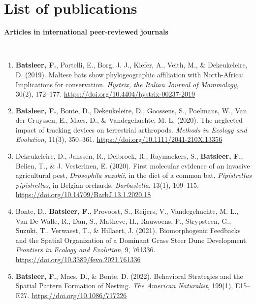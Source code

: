 \documentclass[10pt, twoside]{book} %
\renewcommand{\chaptermark}[1]{\markboth{#1}{}}
\begin{document}
\clearpage
\thispagestyle{plain}
\hbox{}
\clearpage
\newpage
\pagestyle{mainmatter}
\chapter*{List of publications}
\chaptermark{List of publications}

\begin{large}\textbf{Articles in international peer-reviewed journals}\end{large}\\

	\begin{enumerate}
		\item \textbf{Batsleer, F.}, Portelli, E., Borg, J. J., Kiefer, A., Veith, M., \& Dekeukeleire, D. (2019). Maltese bats show phylogeographic affiliation with North-Africa: Implications for conservation. \textit{Hystrix, the Italian Journal of Mammalogy}, 30(2), 172–177. \url{https://doi.org/10.4404/hystrix-00237-2019}
		
		\item \textbf{Batsleer, F.}, Bonte, D., Dekeukeleire, D., Goossens, S., Poelmans, W., Van der Cruyssen, E., Maes, D., \& Vandegehuchte, M. L. (2020). The neglected impact of tracking devices on terrestrial arthropods. \textit{Methods in Ecology and Evolution}, 11(3), 350–361. \url{https://doi.org/10.1111/2041-210X.13356}
		
		\item Dekeukeleire, D., Janssen, R., Delbroek, R., Raymaekers, S., \textbf{Batsleer, F.}, Belien, T., \& J. Vesterinen, E. (2020). First molecular evidence of an invasive agricultural pest, \textit{Drosophila suzukii}, in the diet of a common bat, \textit{Pipistrellus pipistrellus}, in Belgian orchards. \textit{Barbastella}, 13(1), 109–115. \url{https://doi.org/10.14709/BarbJ.13.1.2020.18}
		
		\item Bonte, D., \textbf{Batsleer, F.}, Provoost, S., Reijers, V., Vandegehuchte, M. L., Van De Walle, R., Dan, S., Matheve, H., Rauwoens, P., Strypsteen, G., Suzuki, T., Verwaest, T., \& Hillaert, J. (2021). Biomorphogenic Feedbacks and the Spatial Organization of a Dominant Grass Steer Dune Development. \textit{Frontiers in Ecology and Evolution}, 9, 761336. \url{https://doi.org/10.3389/fevo.2021.761336}
		
		\item \textbf{Batsleer, F.}, Maes, D., \& Bonte, D. (2022). Behavioral Strategies and the Spatial Pattern Formation of Nesting. \textit{The American Naturalist}, 199(1), E15–E27. \url{https://doi.org/10.1086/717226}
		

\end{enumerate}
\end{document}
